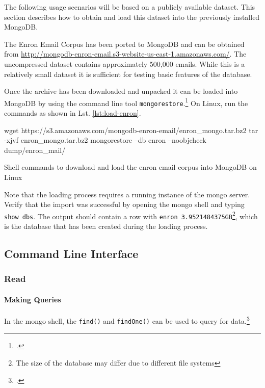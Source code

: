 The following usage scenarios will be based on a publicly available dataset.
This section describes how to obtain and load this dataset into the previously
installed MongoDB.

The Enron Email Corpus has been ported to MongoDB and can be obtained from
\url{http://mongodb-enron-email.s3-website-us-east-1.amazonaws.com/}.
The uncompressed dataset contains approximately 500,000 emails.
While this is a relatively small dataset it is sufficient for
testing basic features of the database.

Once the archive has been downloaded and unpacked it can be loaded into MongoDB
by using the command line tool
\texttt{mongorestore}.\footcite[Cf.][TODO]{http://docs.mongodb.org/manual/reference/program/mongorestore/}
 On Linux, run the commands as shown in Lst. \ref{lst:load-enron}.

\begin{listing}
    \begin{bashcode}
    wget https://s3.amazonaws.com/mongodb-enron-email/enron_mongo.tar.bz2
    tar -xjvf enron_mongo.tar.bz2
    mongorestore --db enron --noobjcheck dump/enron_mail/
    \end{bashcode}
    \caption{Shell commands to download and load the enron email corpus into MongoDB on Linux}
    \label{lst:load-enron}
\end{listing}

Note that the loading process requires a running instance of the mongo server.
Verify that the import was successful by opening the mongo shell and typing
\texttt{show dbs}.
The output should contain a row with \texttt{enron 3.9521484375GB}\footnote{The
size of the database may differ due to different file systems}, which is the
database that has been created during the loading process.


\subsection{Command Line Interface}
\label{sec:usage-cli}


\subsubsection{Read}

\paragraph{Making Queries}
In the mongo shell, the \texttt{find()} and \texttt{findOne()} can be used to
query for data.\footcite[Cf.][7]{mongo_crud_manual}

